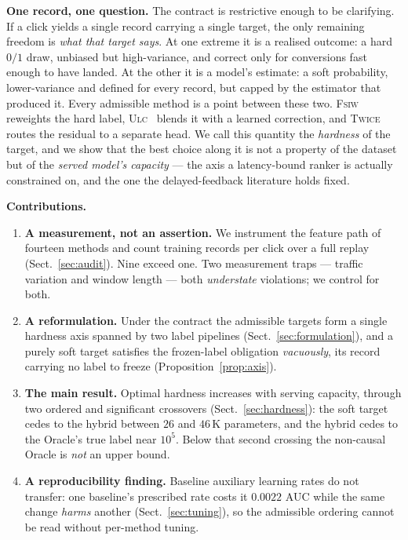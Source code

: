 \documentclass[runningheads]{llncs}
\begin{document}
\smallskip\noindent\textbf{One record, one question.} The contract is restrictive enough to be
clarifying. If a click yields a single record carrying a single target, the only remaining freedom
is \emph{what that target says}. At one extreme it is a realised outcome: a hard $0/1$ draw,
unbiased but high-variance, and correct only for conversions fast enough to have landed. At the
other it is a model's estimate: a soft probability, lower-variance and defined for every record,
but capped by the estimator that produced it. Every admissible method is a point between these two.
\textsc{Fsiw}~\cite{yasui2020feedback} reweights the hard label,
\textsc{Ulc}~\cite{wang2023unbiased} blends it with a learned correction, and
\textsc{Twice}~\cite{li2026twice} routes the residual to a separate head. We call this quantity the
\emph{hardness} of the target, and we show that the best choice along it is not a property of the
dataset but of the \emph{served model's capacity} --- the axis a latency-bound ranker is actually
constrained on, and the one the delayed-feedback literature holds fixed.

\smallskip\noindent\textbf{Contributions.}
\begin{enumerate}
\item \textbf{A measurement, not an assertion.} We instrument the feature path of fourteen methods
and count training records per click over a full replay (Sect.~\ref{sec:audit}). Nine exceed one.
Two measurement traps --- traffic variation and window length --- both \emph{understate} violations;
we control for both.
\item \textbf{A reformulation.} Under the contract the admissible targets form a single hardness
axis spanned by two label pipelines (Sect.~\ref{sec:formulation}), and a purely soft target
satisfies the frozen-label obligation \emph{vacuously}, its record carrying no label to freeze
(Proposition~\ref{prop:axis}).
\item \textbf{The main result.} Optimal hardness increases with serving capacity, through two
ordered and significant crossovers (Sect.~\ref{sec:hardness}): the soft target cedes to the hybrid
between $26$ and $46$\,K parameters, and the hybrid cedes to the Oracle's true label near
$10^{5}$. Below that second crossing the non-causal Oracle is \emph{not} an upper bound.
\item \textbf{A reproducibility finding.} Baseline auxiliary learning rates do not transfer: one
baseline's prescribed rate costs it $0.0022$ AUC while the same change \emph{harms} another
(Sect.~\ref{sec:tuning}), so the admissible ordering cannot be read without per-method tuning.
\end{enumerate}
\end{document}
